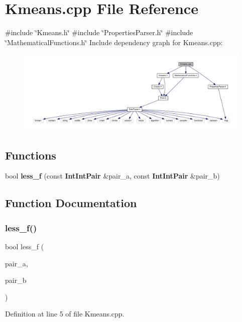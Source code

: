 \section{Kmeans.\+cpp File Reference}
\label{_kmeans_8cpp}
{\ttfamily \#include \char`\"{}Kmeans.\+h\char`\"{}}\newline
{\ttfamily \#include \char`\"{}Properties\+Parser.\+h\char`\"{}}\newline
{\ttfamily \#include \char`\"{}Mathematical\+Functions.\+h\char`\"{}}\newline
Include dependency graph for Kmeans.\+cpp\+:
\nopagebreak
\begin{figure}[H]
\begin{center}
\leavevmode
\includegraphics[width=350pt]{_kmeans_8cpp__incl}
\end{center}
\end{figure}
\subsection*{Functions}
\begin{DoxyCompactItemize}
\item 
bool \textbf{ less\+\_\+f} (const \textbf{ Int\+Int\+Pair} \&pair\+\_\+a, const \textbf{ Int\+Int\+Pair} \&pair\+\_\+b)
\end{DoxyCompactItemize}


\subsection{Function Documentation}
\mbox{\label{_kmeans_8cpp_af55f0370ee6815bfd82fce81e16ad74e}} 
\subsubsection{less\+\_\+f()}
{\footnotesize\ttfamily bool less\+\_\+f (\begin{DoxyParamCaption}\item[{const \textbf{ Int\+Int\+Pair} \&}]{pair\+\_\+a,  }\item[{const \textbf{ Int\+Int\+Pair} \&}]{pair\+\_\+b }\end{DoxyParamCaption})}



Definition at line 5 of file Kmeans.\+cpp.

